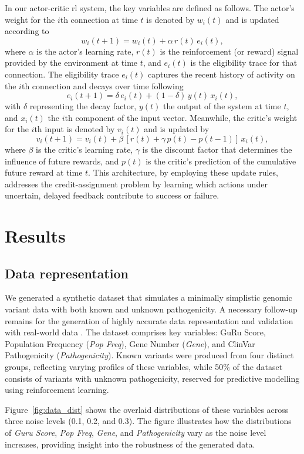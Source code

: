 In our actor-critic \ac{rl} system, the key variables are defined as follows. The actor’s weight for the \(i\)th connection at time \(t\) is denoted by \(w_i(t)\) and is updated according to
\[
w_i(t+1) = w_i(t) + \alpha\, r(t)\, e_i(t),
\]
where \(\alpha\) is the actor’s learning rate, \(r(t)\) is the reinforcement (or reward) signal provided by the environment at time \(t\), and \(e_i(t)\) is the eligibility trace for that connection. The eligibility trace \(e_i(t)\) captures the recent history of activity on the \(i\)th connection and decays over time following
\[
e_i(t+1) = \delta\, e_i(t) + (1-\delta)\, y(t)\, x_i(t),
\]
with \(\delta\) representing the decay factor, \(y(t)\) the output of the system at time \(t\), and \(x_i(t)\) the \(i\)th component of the input vector. Meanwhile, the critic’s weight for the \(i\)th input is denoted by \(v_i(t)\) and is updated by
\[
v_i(t+1) = v_i(t) + \beta\,[r(t) + \gamma\, p(t) - p(t-1)]\, x_i(t),
\]
where \(\beta\) is the critic’s learning rate, \(\gamma\) is the discount factor that determines the influence of future rewards, and \(p(t)\) is the critic’s prediction of the cumulative future reward at time \(t\). This architecture, by employing these update rules, addresses the credit-assignment problem by learning which actions under uncertain, delayed feedback contribute to success or failure.


\section{Results}

\subsection{Data representation}

We generated a synthetic dataset that simulates a minimally simplistic genomic variant data with both known and unknown pathogenicity. 
A necessary follow-up remains for the generation of highly accurate data representation and validation with real-world data .
The dataset comprises key variables: GuRu Score, Population Frequency (\emph{Pop Freq}), Gene Number (\emph{Gene}), and ClinVar Pathogenicity (\emph{Pathogenicity}). Known variants were produced from four distinct groups, reflecting varying profiles of these variables, while 50\% of the dataset consists of variants with unknown pathogenicity, reserved for predictive modelling using reinforcement learning.

Figure~\ref{fig:data_dist} shows the overlaid distributions of these variables across three noise levels (0.1, 0.2, and 0.3). The figure illustrates how the distributions of \emph{Guru Score}, \emph{Pop Freq}, \emph{Gene}, and \emph{Pathogenicity} vary as the noise level increases, providing insight into the robustness of the generated data.

